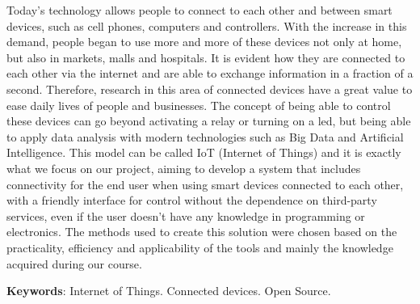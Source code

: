 \documentclass[../../layout.tex]{subfiles}
\begin{document}
\begin{resumo}[Abstract]
\hspace*{3em}
Today's technology allows people to connect to each other and between smart devices, such as cell phones, computers and controllers. With the increase in this demand, people began to use more and more of these devices not only at home, but also in markets, malls and hospitals. It is evident how they are connected to each other via the internet and are able to exchange information in a fraction of a second. Therefore, research in this area of connected devices have a great value to ease daily lives of people and businesses. The concept of being able to control these devices can go beyond activating a relay or turning on a led, but being able to apply data analysis with modern technologies such as Big Data and Artificial Intelligence. This model can be called IoT (Internet of Things) and it is exactly what we focus on our project, aiming to develop a system that includes connectivity for the end user when using smart devices connected to each other, with a friendly interface for control without the dependence on third-party services, even if the user doesn't have any knowledge in programming or electronics. The methods used to create this solution were chosen based on the practicality, efficiency and applicability of the tools and mainly the knowledge acquired during our course.
\vspace{\onelineskip}

\noindent
\textbf{Keywords}: Internet of Things. Connected devices. Open Source.
\end{resumo}
\end{document}
